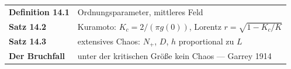 \begin{merksatz}
\begin{center}
\renewcommand{\arraystretch}{1.5}
\begin{tabular}{@{}P{3.0cm}P{5.6cm}@{}}
\toprule
\textbf{Definition 14.1} & Ordnungsparameter, mittleres Feld\\
\textbf{Satz 14.2} & Kuramoto: $K_c = 2/(\pi g(0))$, Lorentz $r = \sqrt{1-K_c/K}$\\
\textbf{Satz 14.3} & extensives Chaos: $N_{+}$, $D$, $h$ proportional zu $L$\\
\textbf{Der Bruchfall} & unter der kritischen Größe kein Chaos --- Garrey 1914\\
\bottomrule
\end{tabular}
\end{center}

\begin{center}
\begin{minipage}{0.88\textwidth}
\end{minipage}
\end{center}
\end{merksatz}
